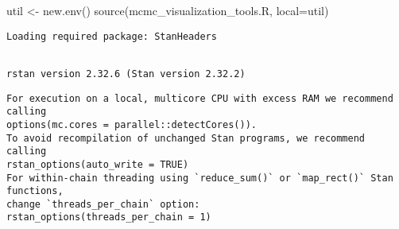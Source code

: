 \documentclass[
  letterpaper,
  DIV=11,
  numbers=noendperiod]{scrartcl}
\newenvironment{Shaded}{\begin{snugshade}}{\end{snugshade}}
\newcommand{\AttributeTok}[1]{\textcolor[rgb]{0.40,0.45,0.13}{#1}}
\newcommand{\DecValTok}[1]{\textcolor[rgb]{0.68,0.00,0.00}{#1}}
\newcommand{\FloatTok}[1]{\textcolor[rgb]{0.68,0.00,0.00}{#1}}
\newcommand{\FunctionTok}[1]{\textcolor[rgb]{0.28,0.35,0.67}{#1}}
\newcommand{\NormalTok}[1]{\textcolor[rgb]{0.00,0.23,0.31}{#1}}
\newcommand{\OtherTok}[1]{\textcolor[rgb]{0.00,0.23,0.31}{#1}}
\newcommand{\SpecialCharTok}[1]{\textcolor[rgb]{0.37,0.37,0.37}{#1}}
\newcommand{\StringTok}[1]{\textcolor[rgb]{0.13,0.47,0.30}{#1}}
\begin{document}
\begin{Shaded}
\begin{Highlighting}[]
\NormalTok{util }\OtherTok{\textless{}{-}} \FunctionTok{new.env}\NormalTok{()}
\FunctionTok{source}\NormalTok{(}\StringTok{\textquotesingle{}mcmc\_visualization\_tools.R\textquotesingle{}}\NormalTok{, }\AttributeTok{local=}\NormalTok{util)}
\end{Highlighting}
\end{Shaded}

\begin{verbatim}
Loading required package: StanHeaders
\end{verbatim}

\begin{verbatim}

rstan version 2.32.6 (Stan version 2.32.2)
\end{verbatim}

\begin{verbatim}
For execution on a local, multicore CPU with excess RAM we recommend calling
options(mc.cores = parallel::detectCores()).
To avoid recompilation of unchanged Stan programs, we recommend calling
rstan_options(auto_write = TRUE)
For within-chain threading using `reduce_sum()` or `map_rect()` Stan functions,
change `threads_per_chain` option:
rstan_options(threads_per_chain = 1)
\end{verbatim}

\begin{Shaded}
\end{Shaded}
\end{document}

